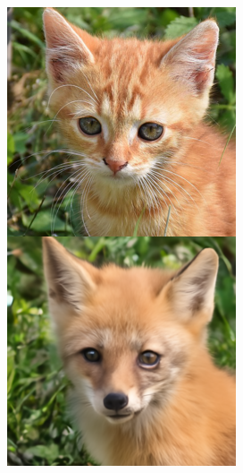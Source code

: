 \documentclass{article}
\begin{document}
\begin{figure}
\begin{minipage}[t]{0.48\textwidth}
        \begin{minipage}[t]{0.19\textwidth}
            \includegraphics[width=\linewidth]{img/afhq_main/afhq256_fwd_3.png}
        \end{minipage}
        \begin{minipage}[t]{0.19\textwidth}

\end{minipage}
\end{minipage}
\end{figure}
\end{document}
